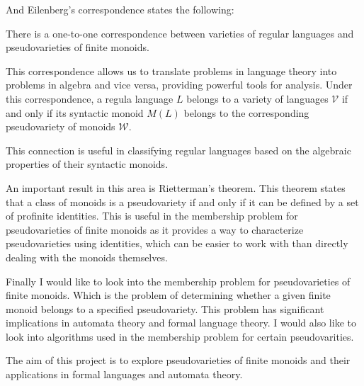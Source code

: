 And Eilenberg's correspondence states the following:

\begin{theorem*}
 There is a one-to-one correspondence between varieties of regular languages and pseudovarieties of finite monoids.
\end{theorem*}

This correspondence allows us to translate problems in language theory into problems in algebra and vice versa, providing powerful tools for analysis. Under this correspondence, a regula language $L$
belongs to a variety of languages $\mathcal{V}$ if and only if its syntactic monoid $M(L)$ belongs to the corresponding pseudovariety of monoids $\mathcal{W}$.

This connection is useful in classifying regular languages based on the algebraic properties of their syntactic monoids.

An important result in this area is Rietterman's theorem\cite{Pin2025}. This theorem states that a class of monoids is a pseudovariety if and only if it can be defined by a set of profinite identities. This is useful in the membership problem for pseudovarieties of finite monoids 
as it provides a way to characterize pseudovarieties using identities, which can be easier to work with than directly dealing with the monoids themselves.

Finally I would like to look into the membership problem for pseudovarieties of finite monoids. Which is the problem of determining whether a given finite monoid belongs to a specified pseudovariety.
This problem has significant implications in automata theory and formal language theory. I would also like to look into algorithms used in the membership problem for certain pseudovarities.

\begin{framed}
    The aim of this project is to explore pseudovarieties of finite monoids and their applications in formal languages and automata theory.
\end{framed}
